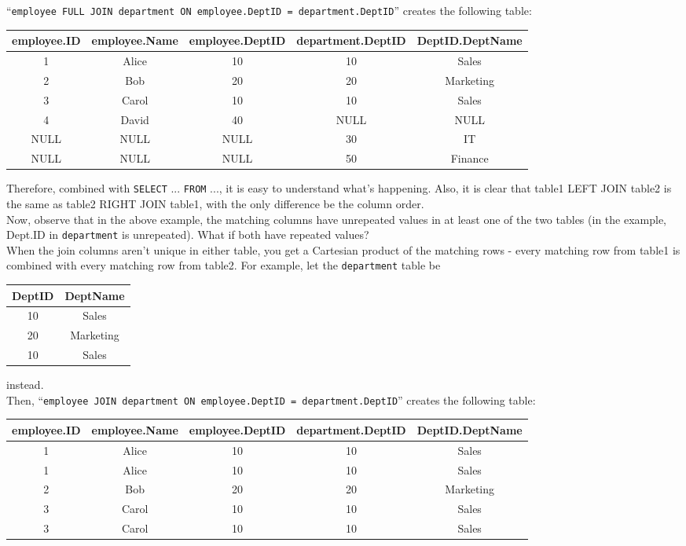 \documentclass{article}
\begin{document}
\begin{itemize}
		``\texttt{employee FULL JOIN department ON employee.DeptID = department.DeptID}'' creates the following table:\\
		\begin{center}
			\begin{tabular}{|c|c|c|c|c|}
				employee.ID & employee.Name  & employee.DeptID & department.DeptID & DeptID.DeptName \\
				\hline
				1  & Alice & 10 & 10 & Sales\\
				2  & Bob   & 20 & 20 & Marketing\\
				3  & Carol & 10 & 10 & Sales\\
				4  & David & 40 & NULL & NULL\\
				NULL  & NULL & NULL & 30 & IT\\
				NULL  & NULL & NULL & 50 & Finance
			\end{tabular}
		\end{center}
		\vspace*{4mm}
		
		Therefore, combined with \texttt{SELECT} ... \texttt{FROM} ..., it is easy to understand what's happening. Also, it is clear that table1 LEFT JOIN table2 is the same as table2 RIGHT JOIN table1, with the only difference be the column order.\\
		
		Now, observe that in the above example, the matching columns have unrepeated values in at least one of the two tables (in the example, Dept.ID in \texttt{department} is unrepeated). What if both have repeated values?\\
		
		When the join columns aren't unique in either table, you get a Cartesian product of the matching rows - every matching row from table1 is combined with every matching row from table2. For example, let the \texttt{department} table be
		\begin{tabular}{|c|c|}
			DeptID & DeptName\\
			\hline
			10 & Sales\\
			20 & Marketing\\
			10 & Sales
		\end{tabular} instead.\\
		
		Then, ``\texttt{employee JOIN department ON employee.DeptID = department.DeptID}'' creates the following table:\\
		\begin{center}
			\begin{tabular}{|c|c|c|c|c|}
				employee.ID & employee.Name  & employee.DeptID & department.DeptID & DeptID.DeptName \\
				\hline
				1  & Alice & 10 & 10 & Sales\\
				1  & Alice & 10 & 10 & Sales\\
				2  & Bob   & 20 & 20 & Marketing\\
				3  & Carol & 10 & 10 & Sales\\
				3  & Carol & 10 & 10 & Sales
			\end{tabular}
		\end{center}
		
	\end{itemize}
	
\end{document}
